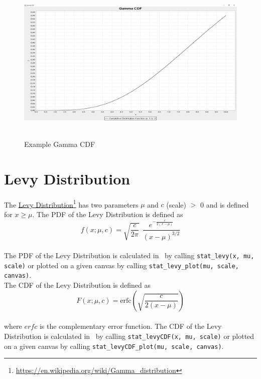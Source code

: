 		\begin{figure}[H]
			\centering
			\includegraphics[width=1\textwidth]{Figures/implemented_functions/gamma_cdf}~\\
			\caption{Example Gamma CDF}
			\label{fig:gamma_cdf}
		\end{figure}


	\section{Levy Distribution}
	
		The \href{https://en.wikipedia.org/wiki/Gamma_distribution}{Levy Distribution}\footnote{\url{https://en.wikipedia.org/wiki/Gamma_distribution}} has two parameters $\mu$ and $c$ (scale) $>$ 0 and is defined for $x \geq \mu$. The \ac{PDF} of the Levy Distribution is defined as
		\\[0.3cm]
		$$f(x;\mu,c)=\sqrt{\frac{c}{2\pi}}~~\frac{e^{ -\frac{c}{2(x-\mu)}}} {(x-\mu)^{3/2}}$$
		\\[0.3cm]
		The \ac{PDF} of the Levy Distribution is calculated in \setlx\ by calling \lstinline{stat_levy(x, mu, scale)} or plotted on a given canvas by calling \lstinline{stat_levy_plot(mu, scale, canvas)}.
		\\[0.3cm]
		The \ac{CDF} of the Levy Distribution is defined as
		\\[0.3cm]
		$$F(x;\mu,c)=\textrm{erfc}\left(\sqrt{\frac{c}{2(x-\mu)}}\right)$$
		\\[0.3cm]
		where $erfc$ is the complementary error function.
		The \ac{CDF} of the Levy Distribution is calculated in \setlx\ by calling \lstinline{stat_levyCDF(x, mu, scale)} or plotted on a given canvas by calling \lstinline{stat_levyCDF_plot(mu, scale, canvas)}.

